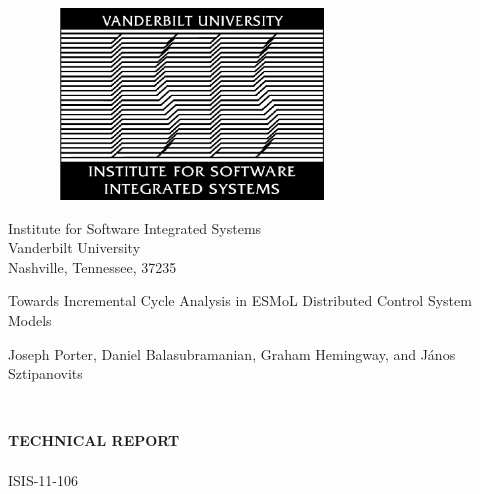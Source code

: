 \begin{figure}[!htp]
\label{fig:ISIS} \vspace{1cm}
\begin{center}
\includegraphics[width=3in,height=2in]{figures/isis_old.png}
\end{center}
\vspace{.0cm}
\end{figure}

\begin{center}\begin{Large}
Institute for Software Integrated Systems \\
Vanderbilt University \\
Nashville, Tennessee, 37235 \\
\end{Large}\end{center}

\vspace{1cm}

\begin{LARGE}
\begin{center}
Towards Incremental Cycle Analysis in ESMoL Distributed Control System Models \\
\vspace{.75cm}
\begin{Large}
Joseph Porter, Daniel Balasubramanian, Graham Hemingway, and J\'{a}nos Sztipanovits
\end{Large}\\
\end{center}
\end{LARGE}

\vspace{2cm}

\begin{Large}
\begin{center}
\textbf{TECHNICAL REPORT} \\
\ \\
ISIS-11-106
\end{center}
\end{Large}

\newpage
